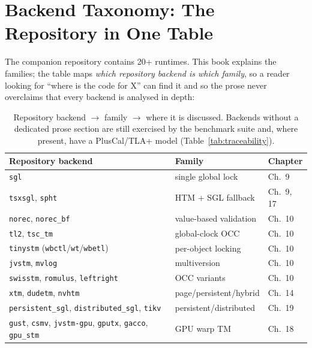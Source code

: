 \section{Backend Taxonomy: The Repository in One Table}
The companion repository contains 20+ runtimes. This book explains the
families; the table maps \emph{which repository backend is which family},
so a reader looking for ``where is the code for X'' can find it and so the
prose never overclaims that every backend is analysed in depth:

\begin{table}[ht]
\centering
\small
\begin{tabular}{lll}
\hline
\textbf{Repository backend} & \textbf{Family} & \textbf{Chapter} \\
\hline
\texttt{sgl}                 & single global lock   & Ch.~9 \\
\texttt{tsxsgl}, \texttt{spht} & HTM + SGL fallback  & Ch.~9, 17 \\
\texttt{norec}, \texttt{norec\_bf} & value-based validation & Ch.~10 \\
\texttt{tl2}, \texttt{tsc\_tm}     & global-clock OCC     & Ch.~10 \\
\texttt{tinystm} (\texttt{wbctl}/\texttt{wt}/\texttt{wbetl}) & per-object locking & Ch.~10 \\
\texttt{jvstm}, \texttt{mvlog}      & multiversion         & Ch.~10 \\
\texttt{swisstm}, \texttt{romulus}, \texttt{leftright} & OCC variants & Ch.~10 \\
\texttt{xtm}, \texttt{dudetm}, \texttt{nvhtm} & page/persistent/hybrid & Ch.~14 \\
\texttt{persistent\_sgl}, \texttt{distributed\_sgl}, \texttt{tikv} & persistent/distributed & Ch.~19 \\
\texttt{gust}, \texttt{csmv}, \texttt{jvstm-gpu}, \texttt{gputx}, \texttt{gacco}, \texttt{gpu\_stm} & GPU warp TM & Ch.~18 \\
\hline
\end{tabular}
\caption{Repository backend $\rightarrow$ family $\rightarrow$ where it is discussed. Backends without a dedicated prose section are still exercised by the benchmark suite and, where present, have a PlusCal/TLA+ model (Table~\ref{tab:traceability}).}
\label{tab:backend-taxonomy}
\end{table}

